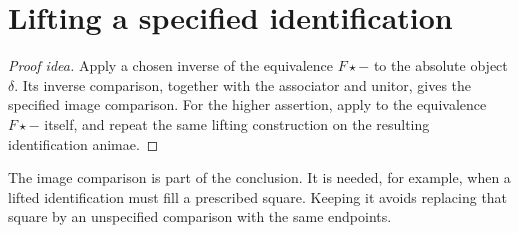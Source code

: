 \documentclass[11pt]{article}
\begin{document}
\section*{Lifting a specified identification}

\begin{proof}[Proof idea]
Apply a chosen inverse of the equivalence $F\star-$ to the absolute object
$\delta$. Its inverse comparison, together with the associator and unitor,
gives the specified image comparison. For the higher assertion, apply
 to the equivalence $F\star-$
itself, and repeat the same lifting construction on the resulting
identification animae.
\end{proof}

The image comparison is part of the conclusion. It is needed, for example,
when a lifted identification must fill a prescribed square. Keeping it
avoids replacing that square by an unspecified comparison with the same
endpoints.
\end{document}
